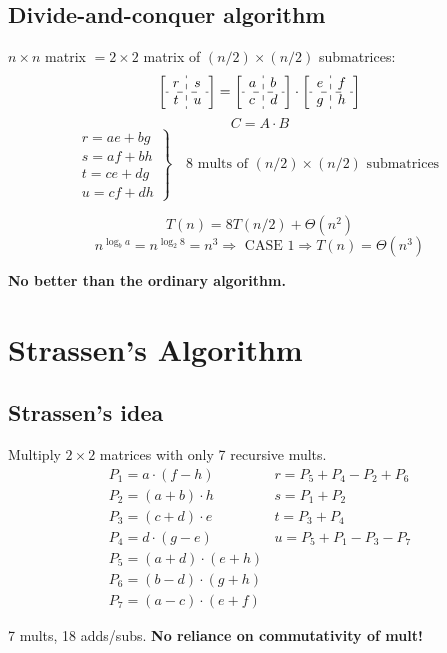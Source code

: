 \documentclass[11pt,toc=twocol]{elegantbook}
\begin{document}
\subsection{Divide-and-conquer algorithm}
\begin{note}
    $n \times n$ matrix $=2 \times 2$ matrix of $(n / 2) \times(n / 2)$ submatrices:
    $$
\left[\begin{array}{c:c}
r & s \\
\hdashline t & u
\end{array}\right]=\left[\begin{array}{l:l}
a & b \\
\hdashline c & d
\end{array}\right] \cdot\left[\begin{array}{c:c}
e & f \\
\hdashline g & h
\end{array}\right]
$$
$$
C=A \cdot B
$$
$$
\left.\begin{array}{l}
r=a e+b g \\
s=a f+b h \\
t=c e+d g \\
u=c f+d h
\end{array}\right\} \quad 8 \text { mults of }(n / 2) \times(n / 2) \text { submatrices }
$$
\end{note}
$$
T(n)=8 T(n / 2)+\Theta\left(n^{2}\right)
$$
$$
n^{\log _{b} a}=n^{\log _{2} 8}=n^{3} \Rightarrow \text { CASE } 1 \Rightarrow T(n)=\Theta\left(n^{3}\right)
$$
\begin{center}
    \textbf{No better than the ordinary algorithm.}
\end{center}
\section{Strassen’s Algorithm}
\subsection{Strassen’s idea}
Multiply $2 \times 2$ matrices with only 7 recursive mults.
$$
\begin{array}{ll}
P_{1}=a \cdot(f-h) & r=P_{5}+P_{4}-P_{2}+P_{6} \\
P_{2}=(a+b) \cdot h & s=P_{1}+P_{2} \\
P_{3}=(c+d) \cdot e & t=P_{3}+P_{4} \\
P_{4}=d \cdot(g-e) & u=P_{5}+P_{1}-P_{3}-P_{7} \\
P_{5}=(a+d) \cdot(e+h) & \\
P_{6}=(b-d) \cdot(g+h) & \\
P_{7}=(a-c) \cdot(e+f) &
\end{array}
$$
\begin{note}
    7 mults, 18 adds/subs. \textbf{No reliance on commutativity of mult!}
\end{note}
\end{document}
